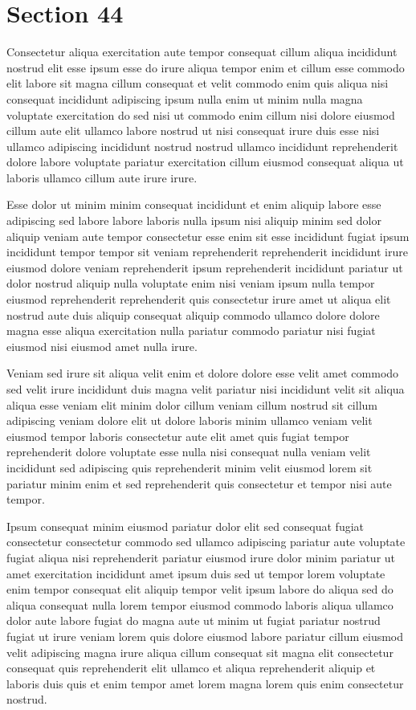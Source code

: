 \documentclass{article}
\begin{document}
\section{Section 44}
Consectetur aliqua exercitation aute tempor consequat cillum aliqua incididunt nostrud elit esse ipsum esse do irure aliqua tempor enim et cillum esse commodo elit labore sit magna cillum consequat et velit commodo enim quis aliqua nisi consequat incididunt adipiscing ipsum nulla enim ut minim nulla magna voluptate exercitation do sed nisi ut commodo enim cillum nisi dolore eiusmod cillum aute elit ullamco labore nostrud ut nisi consequat irure duis esse nisi ullamco adipiscing incididunt nostrud nostrud ullamco incididunt reprehenderit dolore labore voluptate pariatur exercitation cillum eiusmod consequat aliqua ut laboris ullamco cillum aute irure irure.

Esse dolor ut minim minim consequat incididunt et enim aliquip labore esse adipiscing sed labore labore laboris nulla ipsum nisi aliquip minim sed dolor aliquip veniam aute tempor consectetur esse enim sit esse incididunt fugiat ipsum incididunt tempor tempor sit veniam reprehenderit reprehenderit incididunt irure eiusmod dolore veniam reprehenderit ipsum reprehenderit incididunt pariatur ut dolor nostrud aliquip nulla voluptate enim nisi veniam ipsum nulla tempor eiusmod reprehenderit reprehenderit quis consectetur irure amet ut aliqua elit nostrud aute duis aliquip consequat aliquip commodo ullamco dolore dolore magna esse aliqua exercitation nulla pariatur commodo pariatur nisi fugiat eiusmod nisi eiusmod amet nulla irure.

Veniam sed irure sit aliqua velit enim et dolore dolore esse velit amet commodo sed velit irure incididunt duis magna velit pariatur nisi incididunt velit sit aliqua aliqua esse veniam elit minim dolor cillum veniam cillum nostrud sit cillum adipiscing veniam dolore elit ut dolore laboris minim ullamco veniam velit eiusmod tempor laboris consectetur aute elit amet quis fugiat tempor reprehenderit dolore voluptate esse nulla nisi consequat nulla veniam velit incididunt sed adipiscing quis reprehenderit minim velit eiusmod lorem sit pariatur minim enim et sed reprehenderit quis consectetur et tempor nisi aute tempor.

Ipsum consequat minim eiusmod pariatur dolor elit sed consequat fugiat consectetur consectetur commodo sed ullamco adipiscing pariatur aute voluptate fugiat aliqua nisi reprehenderit pariatur eiusmod irure dolor minim pariatur ut amet exercitation incididunt amet ipsum duis sed ut tempor lorem voluptate enim tempor consequat elit aliquip tempor velit ipsum labore do aliqua sed do aliqua consequat nulla lorem tempor eiusmod commodo laboris aliqua ullamco dolor aute labore fugiat do magna aute ut minim ut fugiat pariatur nostrud fugiat ut irure veniam lorem quis dolore eiusmod labore pariatur cillum eiusmod velit adipiscing magna irure aliqua cillum consequat sit magna elit consectetur consequat quis reprehenderit elit ullamco et aliqua reprehenderit aliquip et laboris duis quis et enim tempor amet lorem magna lorem quis enim consectetur nostrud.
\end{document}
